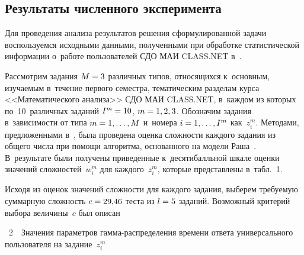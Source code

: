\begin{multicols}{2}
\section{Результаты численного эксперимента}



    Для проведения анализа результатов решения сформулированной задачи 
воспользуемся исходными данными, полученными при обработке 
статистической информации о~работе пользователей СДО МАИ CLASS.NET 
в~\cite{1-b}.
    
    Рассмотрим задания $M\hm=3$ различных типов, относящихся 
к~основным, изучаемым в~течение первого семестра, тематическим разделам 
курса <<Математического анализа>> СДО МАИ CLASS.NET, в~каждом из 
которых по~10~различных заданий $I^m\hm= 10$, $m\hm=1, 2, 3$. Обозначим задания 
в~зависимости от типа $m\hm=1, \ldots , M$ и~номера $i\hm= 1, \ldots , I^m$ 
как~$z_i^m$. Методами, предложенными в~\cite{7-b}, была проведена оценка 
сложности каждого задания из общего числа при помощи алгоритма, 
основанного на модели Раша~\cite{3-b}. В~результате были получены 
приведенные к~десятибалльной шкале оценки значений сложностей~$w_i^m$ 
для каждого~$z_i^m$, которые представлены в~табл.~1. 
    

    Исходя из оценок значений сложности для каж\-до\-го задания, выберем 
требуемую суммарную сложность $c\hm= 29{,}46$ теста из $l\hm=5$ заданий. 
Возможный критерий выбора величины~$c$ был описан\linebreak\vspace*{-10pt}

   { %
    \begin{center}
    \parbox{70mm}{{{\tablename~2}\ \ \small{Значения параметров гамма-распределения времени ответа универсального 
пользователя на задание~$z_i^m$}}

}

     \vspace*{6pt}
     

\end{center}}
\end{multicols}
